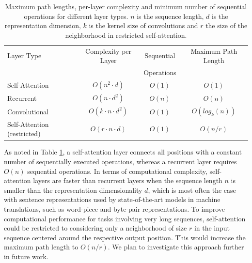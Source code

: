 \documentclass{article}
\begin{document}
\begin{table}[t]
\caption{
  Maximum path lengths, per-layer complexity and minimum number of sequential operations for different layer types. $n$ is the sequence length, $d$ is the representation dimension, $k$ is the kernel size of convolutions and $r$ the size of the neighborhood in restricted self-attention.}

\label{tab:op_complexities}
\begin{center}
\vspace{-1mm}

\begin{tabular}{lccc}
\toprule
Layer Type & Complexity per Layer & Sequential & Maximum Path Length  \\
           &             & Operations &   \\
\hline
\rule{0pt}{2.0ex}Self-Attention & $O(n^2 \cdot d)$ & $O(1)$ & $O(1)$ \\
Recurrent & $O(n \cdot d^2)$ & $O(n)$ & $O(n)$ \\

Convolutional & $O(k \cdot n \cdot d^2)$ & $O(1)$ & $O(log_k(n))$ \\

Self-Attention (restricted)& $O(r \cdot n \cdot d)$ & $O(1)$ & $O(n/r)$ \\

\bottomrule
\end{tabular}

\end{center}
\end{table}

  

As noted in Table \ref{tab:op_complexities}, a self-attention layer connects all positions with a constant number of sequentially executed operations, whereas a recurrent layer requires $O(n)$ sequential operations.
In terms of computational complexity, self-attention layers are faster than recurrent layers when the sequence length $n$ is smaller than the representation dimensionality $d$, which is most often the case with sentence representations used by state-of-the-art models in machine translations, such as word-piece \citep{wu2016google} and byte-pair \citep{sennrich2015neural} representations.
To improve computational performance for tasks involving very long sequences, self-attention could be restricted to considering only a neighborhood of size $r$ in the input sequence centered around the respective output position. This would increase the maximum path length to $O(n/r)$. We plan to investigate this approach further in future work.
\end{document}
